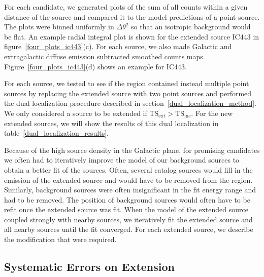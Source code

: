 \documentclass[12pt,preprint]{aastex}
\newcommand{\tsext}{{\ensuremath{\text{TS}_{\text{ext}}}}\xspace}
\newcommand{\tsinc}{\ensuremath{\text{TS}_{\text{inc}}}\xspace}
\begin{document}
For each candidate, we generated plots of the sum of all counts
within a given distance of the source and compared it to the model
predictions of a point source.  The plots were binned uniformly
in $\Delta \theta^2$ so that an isotropic background would be flat.
An example radial integral plot is shown for the extended source IC443
in figure~\ref{four_plots_ic443}(c).  For each source, we also made
Galactic and extragalactic diffuse emission subtracted smoothed counts
maps. Figure~\ref{four_plots_ic443}(d) shows an example for IC443. 

For each source, we tested to see if the region contained instead
multiple point sources by replacing the extended source with
two point sources and performed the dual localization procedure
described in section~\ref{dual_localization_method}.  We only
considered a source to be extended if $\tsext>\tsinc$.  For the new
extended sources, we will show the results of this dual localization in
table~\ref{dual_localization_results}.

Because of the high source density in the Galactic plane, for promising
candidates we often had to iteratively improve the model of our background
sources to obtain a better fit of the sources.  Often, several catalog
sources would fill in the emission of the extended source and would
have to be removed from the region.  Similarly, background sources
were often insignificant in the fit energy range and had to be removed.
The position of background sources would often have to be refit once the
extended source was fit.  When the model of the extended source coupled
strongly with nearby sources, we iteratively fit the extended source and
all nearby sources until the fit converged.  For each extended source,
we describe the modification that were required.

\subsection{Systematic Errors on Extension}
\label{systematic_errors_on_extension}

\end{document}
